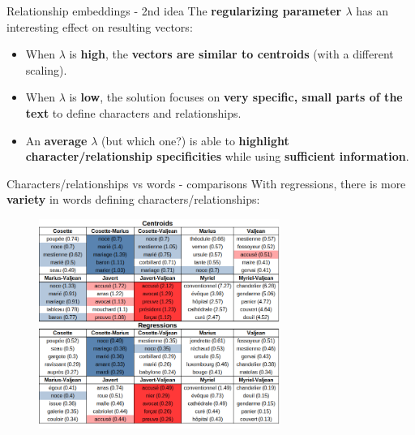 \documentclass[10pt]{beamer}
\newcommand{\imp}[1]{\textbf{\color{cyan}#1}}
\begin{document}
	
	\begin{frame}{Relationship embeddings - 2nd idea}
		The \imp{regularizing parameter $\lambda$} has an interesting effect on resulting vectors:
		\begin{itemize}
			\item When $\lambda$ is \imp{high}, the \imp{vectors are similar to centroids} (with a different scaling).
			\item When $\lambda$ is \imp{low}, the solution focuses on \imp{very specific, small parts of the text} to define characters and relationships.
			\item An \imp{average} $\lambda$ (but which one?) is able to \imp{highlight character/relationship specificities} while using \imp{sufficient information}.
		\end{itemize}
	\end{frame}
	
	
	\begin{frame}{Characters/relationships vs words - comparisons}
		With regressions, there is more \imp{variety} in words defining characters/relationships:
		\vspace{-0.2cm}
		\begin{figure}
			\centering
			\includegraphics[width=0.7\textwidth]{img/reg_vs_word.png}
		\end{figure}
	\end{frame}
	
	
\end{document}
